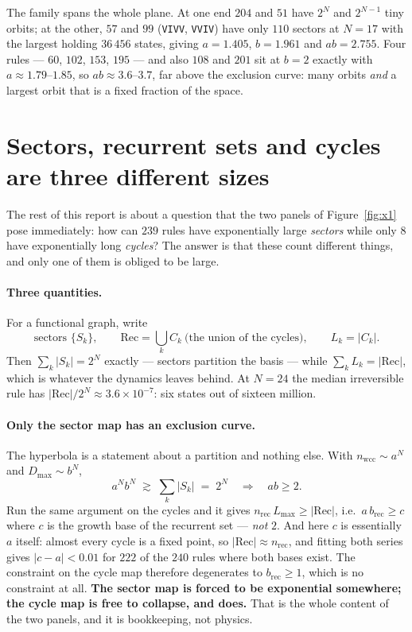 \documentclass[11pt]{article}
\newcommand{\rt}[1]{\texttt{#1}}
\newcommand{\wcc}{\mathrm{wcc}}
\newcommand{\rec}{\mathrm{rec}}
\theoremstyle{plain}
\theoremstyle{definition}
\begin{document}
\noindent The family spans the whole plane. At one end $204$ and $51$ have $2^{N}$
and $2^{N-1}$ tiny orbits; at the other, $57$ and $99$ (\rt{VIVV}, \rt{VVIV})
have only $110$ sectors at $N=17$ with the largest holding $36\,456$ states,
giving $a=1.405$, $b=1.961$ and $ab=2.755$. Four rules --- $60$, $102$, $153$,
$195$ --- and also $108$ and $201$ sit at $b=2$ exactly with $a\approx1.79$--$1.85$,
so $ab\approx3.6$--$3.7$, far above the exclusion curve: many orbits \emph{and} a
largest orbit that is a fixed fraction of the space.

\section{Sectors, recurrent sets and cycles are three different sizes}
\label{sec:three}

The rest of this report is about a question that the two panels of
Figure~\ref{fig:x1} pose immediately: how can $239$ rules have exponentially
large \emph{sectors} while only $8$ have exponentially long \emph{cycles}? The
answer is that these count different things, and only one of them is obliged to
be large.

\paragraph{Three quantities.} For a functional graph, write
\[
\text{sectors } \{S_k\},\qquad
\mathrm{Rec}=\bigcup_k C_k \ \text{(the union of the cycles)},\qquad
L_k=|C_k| .
\]
Then $\sum_k|S_k| = 2^N$ exactly --- sectors partition the basis --- while
$\sum_k L_k = |\mathrm{Rec}|$, which is whatever the dynamics leaves behind. At
$N=24$ the median irreversible rule has $|\mathrm{Rec}|/2^N \approx
3.6\times10^{-7}$: six states out of sixteen million.

\paragraph{Only the sector map has an exclusion curve.} The hyperbola is a
statement about a partition and nothing else. With $n_\wcc\sim a^N$ and
$D_{\max}\sim b^N$,
\[
a^N b^N \;\gtrsim\; \sum_k |S_k| \;=\; 2^N \quad\Longrightarrow\quad ab\ge2 .
\]
Run the same argument on the cycles and it gives $n_\rec\,L_{\max}\ge
|\mathrm{Rec}|$, i.e.\ $a\,b_\rec \ge c$ where $c$ is the growth base of the
recurrent set --- \emph{not} $2$. And here $c$ is essentially $a$ itself: almost
every cycle is a fixed point, so $|\mathrm{Rec}|\approx n_\rec$, and fitting both
series gives $|c-a|<0.01$ for $222$ of the $240$ rules where both bases exist.
The constraint on the cycle map therefore degenerates to $b_\rec\ge1$, which is
no constraint at all. \textbf{The sector map is forced to be exponential
somewhere; the cycle map is free to collapse, and does.} That is the whole
content of the two panels, and it is bookkeeping, not physics.
\end{document}
